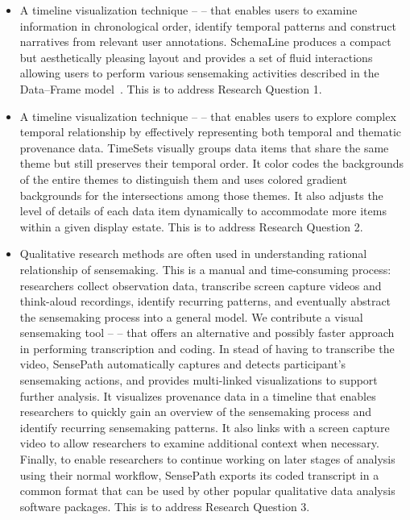 \begin{itemize}
	\item A timeline visualization technique -- \emph{} -- that enables users to examine information in chronological order, identify temporal patterns and construct narratives from relevant user annotations. SchemaLine produces a compact but aesthetically pleasing layout and provides a set of fluid interactions allowing users to perform various sensemaking activities described in the Data--Frame model~\cite{Klein2003}. This is to address Research Question 1.
	
	\item A timeline visualization technique -- \emph{} -- that enables users to explore complex temporal relationship by effectively representing both temporal and thematic provenance data. TimeSets visually groups data items that share the same theme but still preserves their temporal order. It color codes the backgrounds of the entire themes to distinguish them and uses colored gradient backgrounds for the intersections among those themes. It also adjusts the level of details of each data item dynamically to accommodate more items within a given display estate. This is to address Research Question 2. 
	
	\item Qualitative research methods are often used in understanding rational relationship of sensemaking. This is a manual and time-consuming process: researchers collect observation data, transcribe screen capture videos and think-aloud recordings, identify recurring patterns, and eventually abstract the sensemaking process into a general model. We contribute a visual sensemaking tool -- \emph{} -- that offers an alternative and possibly faster approach in performing transcription and coding. In stead of having to transcribe the video, SensePath automatically captures and detects participant's sensemaking actions, and provides multi-linked visualizations to support further analysis. It visualizes provenance data in a timeline that enables researchers to quickly gain an overview of the sensemaking process and identify recurring sensemaking patterns. It also links with a screen capture video to allow researchers to examine  additional context when necessary. Finally, to enable researchers to continue working on later stages of analysis using their normal workflow, SensePath exports its coded transcript in a common format that can be used by other popular qualitative data analysis software packages. This is to address Research Question 3.	
	

\end{itemize}
